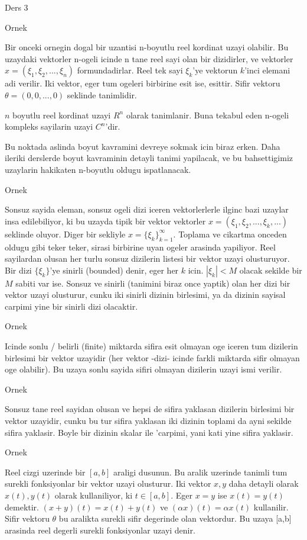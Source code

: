 \documentclass[12pt,fleqn]{article}
\begin{document}
Ders 3

Ornek 

Bir onceki ornegin dogal bir uzantisi n-boyutlu reel kordinat uzayi
olabilir. Bu uzaydaki vektorler n-ogeli icinde n tane reel sayi olan bir
dizidirler, ve vektorler $x = (\xi_1, \xi_2,...,\xi_n)$
formundadirlar. Reel tek sayi $\xi_k$'ye vektorun $k$'inci elemani adi
verilir. Iki vektor, eger tum ogeleri birbirine esit ise, esittir. Sifir
vektoru $\theta = (0,0,...,0)$ seklinde tanimlidir. 

$n$ boyutlu reel kordinat uzayi $R^n$ olarak tanimlanir. Buna tekabul eden
n-ogeli kompleks sayilarin uzayi $C^n$'dir. 

Bu noktada aslinda boyut kavramini devreye sokmak icin biraz erken. Daha
ileriki derslerde boyut kavraminin detayli tanimi yapilacak, ve bu
bahsettigimiz uzaylarin hakikaten n-boyutlu oldugu ispatlanacak. 

Ornek 

Sonsuz sayida eleman, sonsuz ogeli dizi iceren vektorlerlerle ilginc bazi
uzaylar insa edilebiliyor, ki bu uzayda tipik bir vektor vektorler 
$x =
(\xi_1, \xi_2,...,\xi_k,...)$ seklinde oluyor. Diger bir sekliyle $x =
\{\xi_k\} _{k=1}^{\infty}$. 
Toplama ve cikartma onceden oldugu gibi teker teker, sirasi birbirine uyan
ogeler arasinda yapiliyor. Reel sayilardan olusan her turlu sonsuz
dizilerin listesi bir vektor uzayi olusturuyor. Bir dizi $\{\xi_k\}$'ye
sinirli (bounded) denir, eger her $k$ icin.  $|\xi_k| < M$ olacak sekilde
bir $M$ sabiti var ise. Sonsuz ve sinirli (tanimini biraz once yaptik) olan 
her dizi bir vektor uzayi olusturur, cunku iki sinirli dizinin birlesimi, ya
da dizinin sayisal carpimi yine bir sinirli dizi olacaktir. 

Ornek 

Icinde sonlu / belirli (finite) miktarda sifira esit olmayan oge iceren tum
dizilerin birlesimi bir vektor uzayidir (her vektor -dizi- icinde farkli
miktarda sifir olmayan oge olabilir). Bu uzaya sonlu sayida sifiri olmayan
dizilerin uzayi ismi verilir. 

Ornek

Sonsuz tane reel sayidan olusan ve hepsi de sifira yaklasan dizilerin
birlesimi bir vektor uzayidir, cunku bu tur sifira yaklasan iki dizinin
toplami da ayni sekilde sifira yaklasir. Boyle bir dizinin skalar ile
'carpimi, yani kati yine sifira yaklasir. 

Ornek 

Reel cizgi uzerinde bir $[a,b]$ araligi dusunun. Bu aralik uzerinde tanimli
tum surekli fonksiyonlar bir vektor uzayi olusturur. Iki vektor $x,y$ daha
detayli olarak $x(t),y(t)$ olarak kullaniliyor, ki $t \in [a,b]$. Eger $x =
y$ ise 
$x(t) = y(t)$ demektir. $(x+y)(t) = x(t) + y(t)$ ve $(\alpha x)(t) =
\alpha x(t)$ kullanilir. 
Sifir vektoru $\theta$ bu aralikta surekli sifir degerinde olan vektordur. 
Bu uzaya [a,b] arasinda reel degerli surekli fonksiyonlar uzayi denir. 
\end{document}
